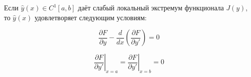 Если $\widehat{y}(x) \in C^1 [a, b]$ даёт слабый локальный экстремум
функционала $J(y)$, то $\widehat{y}(x)$ удовлетворяет
следующим условиям:

$$
\frac{\partial F}{\partial y} - 
\frac{d}{dx} \left( \frac{\partial F}{\partial y'} \right) = 0
$$

$$
\left. \frac{\partial F}{\partial y'} \right|_{x = a} = 
\left. \frac{\partial F}{\partial y'} \right|_{x = b} = 0
$$
